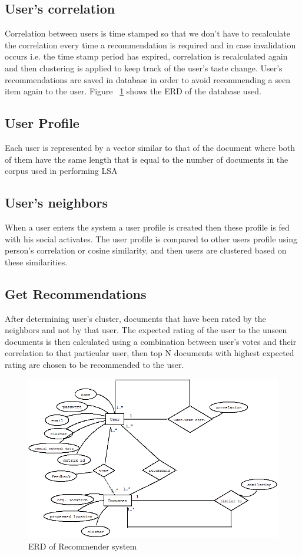 \subsection{User's correlation}
Correlation between users is time stamped so that we don't have to recalculate the correlation every time a recommendation is required and in case invalidation occurs i.e. the time stamp period has expired, correlation is recalculated again and then clustering is applied to keep track of the user's taste change.
User's recommendations are saved in database in order to avoid recommending a seen item again to the user. Figure ~\ref{fig:reco_2} shows the ERD of the database used.

\subsection{User Profile}
Each user is represented by a vector similar to that of the document where both of them have the same length that is equal to the number of documents in the corpus used in performing LSA
\subsection{User's neighbors}
When a user enters the system a user profile is created then these profile is fed with his social activates. The user profile is compared to other users profile using person's correlation or cosine similarity, and then users are clustered based on these similarities.
\subsection{Get Recommendations}
After determining user's cluster, documents that have been rated by the neighbors and not by that user. The expected rating of the user to the unseen documents is then calculated using a combination between user's votes and their correlation to that particular user, then top N documents with highest expected rating are chosen to be recommended to the user.


\begin{figure}[htb]
\begin{center}
\includegraphics[totalheight=.75\textheight,
width=.75\textwidth]{./Figures/reco_2.png}
\end{center}
\caption{ERD of Recommender system}
\label{fig:reco_2}
\end{figure}

